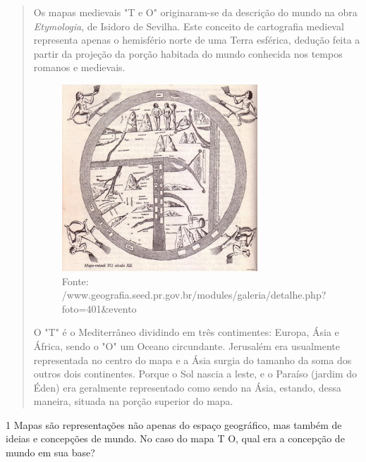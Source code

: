 \begin{quote}
Os mapas medievais "T e O" originaram-se da descrição do mundo na
obra \emph{Etymologia}, de Isidoro de Sevilha. Este conceito de
cartografia medieval representa apenas o hemisfério norte de uma Terra
esférica, dedução feita a partir da projeção da porção habitada do mundo
conhecida nos tempos romanos e medievais.

\begin{figure}[htpb!]
\includegraphics[width=2.88577in,height=2.76032in]{./imgs/img1.jpg}
\caption{Fonte: /www.geografia.seed.pr.gov.br/modules/galeria/detalhe.php?foto=401\&evento}
\end{figure}

O "T" é o Mediterrâneo
dividindo em três contimentes: Europa, Ásia e África, sendo o "O" um
Oceano circundante. Jerusalém era usualmente representada no centro do
mapa e a Ásia surgia do tamanho da soma dos outros dois continentes.
Porque o Sol nascia a leste, e o Paraíso (jardim do Éden) era geralmente
representado como sendo na Ásia, estando, dessa maneira, situada na
porção superior do mapa.

\end{quote}

\num{1} Mapas são representações não apenas do espaço geográfico, mas também
de ideias e concepções de mundo. No caso do mapa T O, qual era a
concepção de mundo em sua base?



